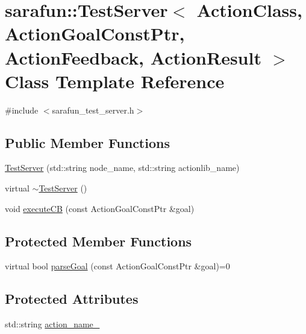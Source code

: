 \hypertarget{classsarafun_1_1TestServer}{\section{sarafun\-:\-:Test\-Server$<$ Action\-Class, Action\-Goal\-Const\-Ptr, Action\-Feedback, Action\-Result $>$ Class Template Reference}
\label{classsarafun_1_1TestServer}
}


{\ttfamily \#include $<$sarafun\-\_\-test\-\_\-server.\-h$>$}

\subsection*{Public Member Functions}
\begin{DoxyCompactItemize}
\item 
\hyperlink{classsarafun_1_1TestServer_a96cf3cc9457ec2c15490f2e2d216ce1f}{Test\-Server} (std\-::string node\-\_\-name, std\-::string actionlib\-\_\-name)
\item 
virtual \hyperlink{classsarafun_1_1TestServer_a1f29e46804b976730e607ca995684dca}{$\sim$\-Test\-Server} ()
\item 
void \hyperlink{classsarafun_1_1TestServer_af09ba35e2df86537a878f7a9de8c795e}{execute\-C\-B} (const Action\-Goal\-Const\-Ptr \&goal)
\end{DoxyCompactItemize}
\subsection*{Protected Member Functions}
\begin{DoxyCompactItemize}
\item 
virtual bool \hyperlink{classsarafun_1_1TestServer_a85b9721105c2a4b46bae26428433513e}{parse\-Goal} (const Action\-Goal\-Const\-Ptr \&goal)=0
\end{DoxyCompactItemize}
\subsection*{Protected Attributes}
\begin{DoxyCompactItemize}
\item 
std\-::string \hyperlink{classsarafun_1_1TestServer_abe393cc25c73386e7d6783127adf98d9}{action\-\_\-name\-\_\-}
\end{DoxyCompactItemize}


